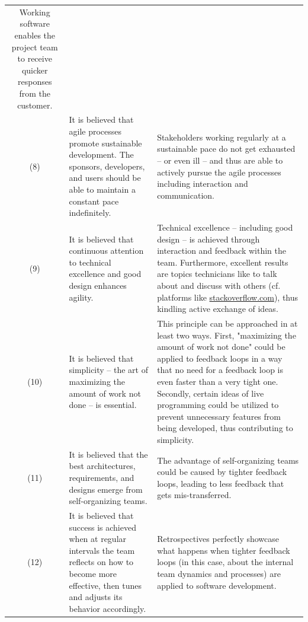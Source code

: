\begin{block}
\begin{longtable}{@{}cp{}p{}@{}}
    Working software enables the project team to receive quicker responses from the customer.
    \\
    (8) &
    It is believed that agile processes promote sustainable development.
    The sponsors, developers, and users should be able to maintain a constant pace indefinitely.&
    Stakeholders working regularly at a sustainable pace do not get exhausted -- or even ill -- and thus are able to actively pursue the agile processes including interaction and communication.
    \\
    (9) &
    It is believed that continuous attention to technical excellence and good design enhances agility.&
    Technical excellence -- including good design -- is achieved through interaction and feedback within the team. Furthermore, excellent results are topics technicians like to talk about and discuss with others (cf. platforms like \href{https://stackoverflow.com}{stackoverflow.com}), thus kindling active exchange of ideas.
    \\
    (10) &
    It is believed that simplicity – the art of maximizing the amount of work not done – is essential.&
    This principle can be approached in at least two ways.
    First, "maximizing the amount of work not done" could be applied to feedback loops in a way that no need for a feedback loop is even faster than a very tight one.
    Secondly, certain ideas of live programming could be utilized to prevent unnecessary features from being developed, thus contributing to simplicity.
    \\
    (11) &
    It is believed that the best architectures, requirements, and designs emerge from self-organizing teams.&
    The advantage of self-organizing teams could be caused by tighter feedback loops, leading to less feedback that gets mis-transferred.
    \\
    (12) &
    It is believed that success is achieved when at regular intervals the team reflects on how to become more effective, then tunes and adjusts its behavior accordingly.&
    Retrospectives perfectly showcase what happens when tighter feedback loops (in this case, about the internal team dynamics and processes) are applied to software development.
    \\
\end{longtable}
\end{block}


